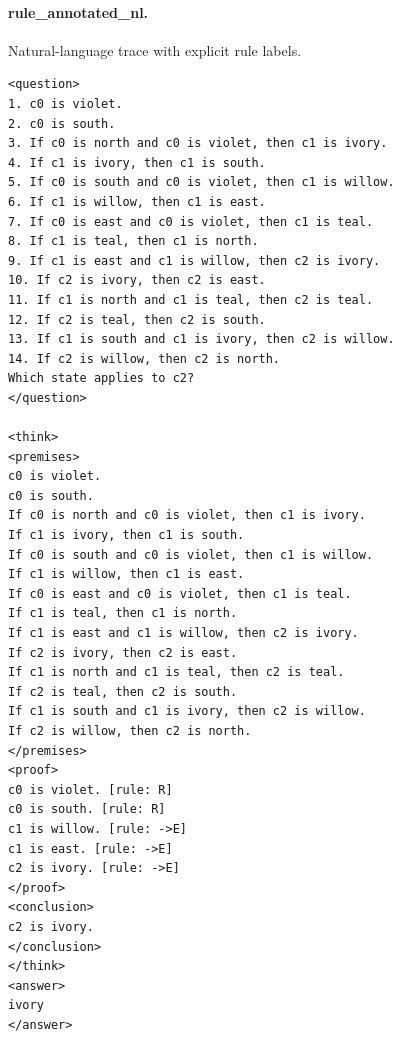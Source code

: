 \documentclass[10pt]{article}
\begin{document}
\paragraph{rule\_annotated\_nl.} Natural-language trace with explicit rule labels.
\begin{verbatim}
<question>
1. c0 is violet.
2. c0 is south.
3. If c0 is north and c0 is violet, then c1 is ivory.
4. If c1 is ivory, then c1 is south.
5. If c0 is south and c0 is violet, then c1 is willow.
6. If c1 is willow, then c1 is east.
7. If c0 is east and c0 is violet, then c1 is teal.
8. If c1 is teal, then c1 is north.
9. If c1 is east and c1 is willow, then c2 is ivory.
10. If c2 is ivory, then c2 is east.
11. If c1 is north and c1 is teal, then c2 is teal.
12. If c2 is teal, then c2 is south.
13. If c1 is south and c1 is ivory, then c2 is willow.
14. If c2 is willow, then c2 is north.
Which state applies to c2?
</question>

<think>
<premises>
c0 is violet.
c0 is south.
If c0 is north and c0 is violet, then c1 is ivory.
If c1 is ivory, then c1 is south.
If c0 is south and c0 is violet, then c1 is willow.
If c1 is willow, then c1 is east.
If c0 is east and c0 is violet, then c1 is teal.
If c1 is teal, then c1 is north.
If c1 is east and c1 is willow, then c2 is ivory.
If c2 is ivory, then c2 is east.
If c1 is north and c1 is teal, then c2 is teal.
If c2 is teal, then c2 is south.
If c1 is south and c1 is ivory, then c2 is willow.
If c2 is willow, then c2 is north.
</premises>
<proof>
c0 is violet. [rule: R]
c0 is south. [rule: R]
c1 is willow. [rule: ->E]
c1 is east. [rule: ->E]
c2 is ivory. [rule: ->E]
</proof>
<conclusion>
c2 is ivory.
</conclusion>
</think>
<answer>
ivory
</answer>
\end{verbatim}
\end{document}
